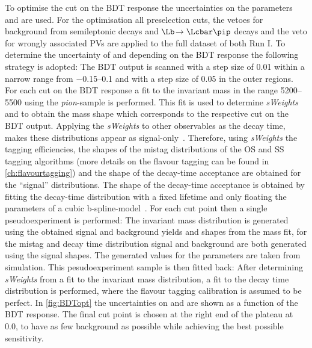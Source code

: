To optimise the cut on the \ac{BDT} response the uncertainties on the \CP parameters \Sf and \Sfbar are used.
For the optimisation all preselection cuts, the vetoes for background from semileptonic decays and $\Lb\!\to\Lcbar\pip$ decays and the veto for wrongly associated \ac{PV}s are applied to the full dataset of both Run I.
To determine the uncertainty of \Sf and \Sfbar depending on the \ac{BDT} response the following strategy is adopted:
The \ac{BDT} output is scanned with a step size of \num{0.01} within a narrow range from \numrange{-0.15}{0.1} and with a step size of \num{0.05} in the outer regions.
For each cut on the \ac{BDT} response a fit to the invariant \Bz mass in the range \SIrange[per-mode=symbol]{5200}{5500}{\MeVcc} using the \emph{pion}-sample is performed.
This fit is used to determine \emph{sWeights}~\cite{Pivk:2004ty} and to obtain the mass shape which corresponds to the respective cut on the \ac{BDT} output.
Applying the \emph{sWeights} to other observables as the decay time, makes these distributions appear as signal-only~\cite{2009arXiv0905.0724X}.
Therefore, using \emph{sWeights} the tagging efficiencies, the shapes of the mistag distributions of the OS and SS tagging algorithms (more details on the flavour tagging can be found in \cref{ch:flavourtagging}) and the shape of the decay-time acceptance are obtained for the \enquote{signal} distributions.
The shape of the decay-time acceptance is obtained by fitting the decay-time distribution with a fixed lifetime and only floating the parameters of a cubic b-spline-model~\cite{splines}.
For each cut point then a single pseudoexperiment is performed: The invariant mass distribution is generated using the obtained signal and background yields and shapes from the mass fit, for the mistag and decay time distribution signal and background are both generated using the signal shapes.
The generated values for the \CP parameters are taken from simulation.
This pesudoexperiment sample is then fitted back: After determining \emph{sWeights} from a fit to the invariant \Bz mass distribution, a \CP fit to the decay time distribution is performed, where the flavour tagging calibration is assumed to be perfect.
In \cref{fig:BDTopt} the uncertainties on \Sf and \Sfbar are shown as a function of the \ac{BDT} response.
The final cut point is chosen at the right end of the plateau at \num{0.0}, to have as few background as possible while achieving the best possible sensitivity.
